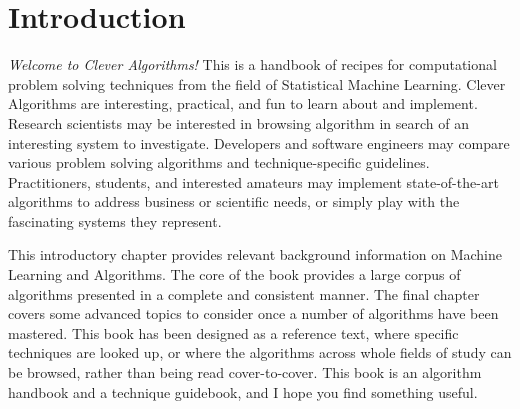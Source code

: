 

\chapter{Introduction}
\label{chap:intro}
\begin{bibunit}

\emph{Welcome to Clever Algorithms!} This is a handbook of recipes for computational problem solving techniques from the field of Statistical Machine Learning. 
Clever Algorithms are interesting, practical, and fun to learn about and implement.
Research scientists may be interested in browsing algorithm in search of an interesting system to investigate. Developers and software engineers may compare various problem solving algorithms and technique-specific guidelines. Practitioners, students, and interested amateurs may implement state-of-the-art algorithms to address business or scientific needs, or simply play with the fascinating systems they represent.

This introductory chapter provides relevant background information on Machine Learning and Algorithms. The core of the book provides a large corpus of algorithms presented in a complete and consistent manner. The final chapter covers some advanced topics to consider once a number of algorithms have been mastered. This book has been designed as a reference text, where specific techniques are looked up, or where the algorithms across whole fields of study can be browsed, rather than being read cover-to-cover. This book is an algorithm handbook and a technique guidebook, and I hope you find something useful.







\renewcommand{\bibsection}{\section{\bibname}}
\putbib
\end{bibunit}